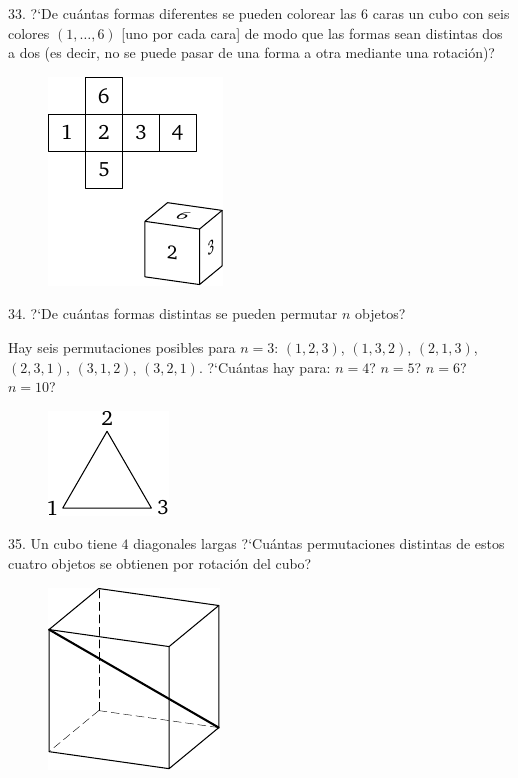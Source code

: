 \begin{problem}{33.}
	?`De cu\'antas formas diferentes se pueden colorear las 6 caras un cubo con seis colores $(1,\dotsc,6)$ [uno por cada cara]
	de modo que las formas sean distintas dos a dos (es decir, no se puede pasar de una forma a otra mediante una rotaci\'on)?
	\begin{figure}
		\includegraphics{taskbook-17}
	\end{figure}
\end{problem}

\begin{problem}{34.}
	?`De cu\'antas formas distintas se pueden permutar $n$ objetos?

	Hay seis permutaciones posibles para $n=3$: $(1,2,3)$, $(1,3,2)$, $(2,1,3)$, $(2,3,1)$, $(3,1,2)$, $(3,2,1)$. ?`Cu\'antas hay para: $n=4$? $n=5$? $n=6$? $n=10$?
	\begin{figure}
		\includegraphics{taskbook-18}
	\end{figure}
\end{problem}

\begin{problem}{35.}
	Un cubo tiene $4$ diagonales largas ?`Cu\'antas permutaciones distintas de estos cuatro objetos se obtienen por rotaci\'on del cubo?
	\begin{figure}
		\includegraphics{taskbook-19}
	\end{figure}
\end{problem}

